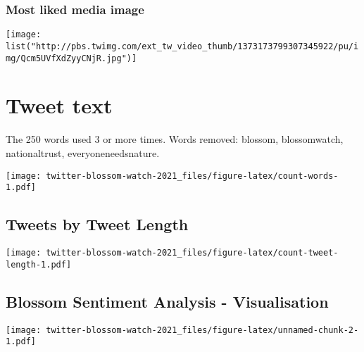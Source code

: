 \documentclass[
]{article}
\begin{document}
\hypertarget{most-liked-media-image}{%
\subsubsection{Most liked media image}\label{most-liked-media-image}}

\texttt{[image: list("http://pbs.twimg.com/ext\_tw\_video\_thumb/1373173799307345922/pu/img/Qcm5UVfXdZyyCNjR.jpg")]}

\hypertarget{tweet-text}{%
\section{Tweet text}\label{tweet-text}}

The 250 words used 3 or more times. Words removed: blossom,
blossomwatch, nationaltrust, everyoneneedsnature.

\texttt{[image: twitter-blossom-watch-2021\_files/figure-latex/count-words-1.pdf]}

\hypertarget{tweets-by-tweet-length}{%
\subsection{Tweets by Tweet Length}\label{tweets-by-tweet-length}}

\texttt{[image: twitter-blossom-watch-2021\_files/figure-latex/count-tweet-length-1.pdf]}

\hypertarget{blossom-sentiment-analysis---visualisation}{%
\subsection{Blossom Sentiment Analysis -
Visualisation}\label{blossom-sentiment-analysis---visualisation}}

\texttt{[image: twitter-blossom-watch-2021\_files/figure-latex/unnamed-chunk-2-1.pdf]}
\end{document}
